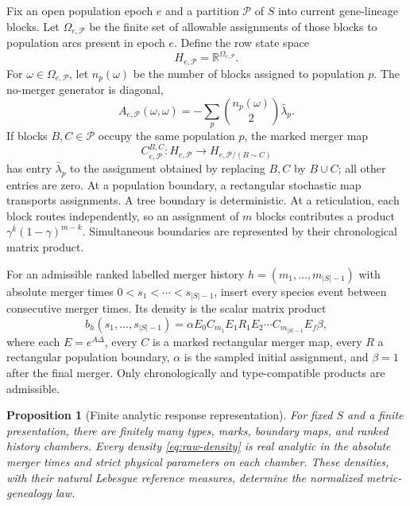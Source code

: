 \documentclass[11pt]{article}
\newtheorem{proposition}[theorem]{Proposition}
\newcommand{\R}{\mathbb R}
\newcommand{\cP}{\mathcal P}
\begin{document}
Fix an open population epoch $e$ and a partition $\cP$ of $S$ into current gene-lineage blocks.  Let $\Omega_{e,\cP}$ be the finite set of allowable assignments of those blocks to population arcs present in epoch $e$.  Define the row state space
\[
H_{e,\cP}=\R^{\Omega_{e,\cP}}.
\]
For $\omega\in\Omega_{e,\cP}$, let $n_p(\omega)$ be the number of blocks assigned to population $p$.  The no-merger generator is diagonal,
\begin{equation}
A_{e,\cP}(\omega,\omega)
=-\sum_p \binom{n_p(\omega)}2\bar\lambda_p.
\label{eq:no-merger}
\end{equation}
If blocks $B,C\in\cP$ occupy the same population $p$, the marked merger map
\[
C^{B,C}_{e,\cP}:H_{e,\cP}\longrightarrow H_{e,\cP/(B\sim C)}
\]
has entry $\bar\lambda_p$ to the assignment obtained by replacing $B,C$ by $B\cup C$; all other entries are zero.  At a population boundary, a rectangular stochastic map transports assignments.  A tree boundary is deterministic.  At a reticulation, each block routes independently, so an assignment of $m$ blocks contributes a product $\gamma^k(1-\gamma)^{m-k}$.  Simultaneous boundaries are represented by their chronological matrix product.

For an admissible ranked labelled merger history $h=(m_1,\ldots,m_{|S|-1})$ with absolute merger times $0<s_1<\cdots<s_{|S|-1}$, insert every species event between consecutive merger times.  Its density is the scalar matrix product
\begin{equation}
b_h(s_1,\ldots,s_{|S|-1})
=\alpha E_0 C_{m_1}E_1R_1E_2\cdots C_{m_{|S|-1}}E_f\beta,
\label{eq:raw-density}
\end{equation}
where each $E=e^{A\Delta}$, every $C$ is a marked rectangular merger map, every $R$ a rectangular population boundary, $\alpha$ is the sampled initial assignment, and $\beta=1$ after the final merger.  Only chronologically and type-compatible products are admissible.

\begin{proposition}[Finite analytic response representation]
\label{prop:raw-finite}
For fixed $S$ and a finite presentation, there are finitely many types, marks, boundary maps, and ranked history chambers.  Every density \eqref{eq:raw-density} is real analytic in the absolute merger times and strict physical parameters on each chamber.  These densities, with their natural Lebesgue reference measures, determine the normalized metric-genealogy law.
\end{proposition}
\end{document}
